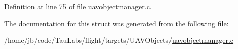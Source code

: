 \-Definition at line 75 of file uavobjectmanager.\-c.



\-The documentation for this struct was generated from the following file\-:\begin{DoxyCompactItemize}
\item 
/home/jb/code/\-Tau\-Labs/flight/targets/\-U\-A\-V\-Objects/\hyperlink{uavobjectmanager_8c}{uavobjectmanager.\-c}\end{DoxyCompactItemize}
